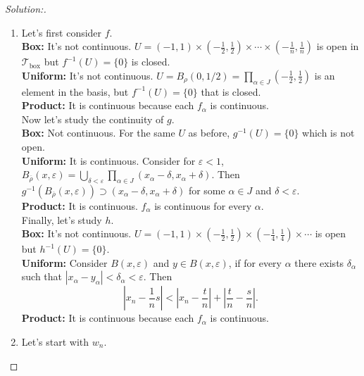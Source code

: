 \documentclass[a4paper,12pt, reqno]{article}
\theoremstyle{definition}
\newenvironment{solution}{\begin{proof}[Solution:]}{\end{proof}}
\newcommand{\T}{\mathscr{T}}
\begin{document}
\begin{solution}\hfill
  \begin{enumerate}[label=(\alph*)]
    \item Let's first consider $f$.\\

          \textbf{Box:} It's not continuous. $U = (-1,1)\times(-\frac{1}{2},\frac{1}{2})\times\cdots\times(-\frac{1}{n},\frac{1}{n})$ is open in $\T_{\text{box}}$ but $f^{-1}(U) = \{ 0 \}$ is closed.\\
          \textbf{Uniform:} It's not continuous. $U = B_{\rho}(0,1/2) = \prod_{\alpha\in J} (-\frac{1}{2},\frac{1}{2})$ is an element in the basis, but $f^{-1}(U) = \{ 0 \}$ that is closed.\\
          \textbf{Product:} It is continuous because each $f_{\alpha}$ is continuous.\\

          Now let's study the continuity of $g$.\\

          \textbf{Box:} Not continuous. For the same $U$ as before, $g^{-1}(U)=\{ 0 \}$ which is not open.\\
          \textbf{Uniform:} It is continuous. Consider for $\varepsilon<1$, $B_{\overline{\rho}}(x,\varepsilon) = \bigcup_{\delta<\varepsilon}\prod_{\alpha\in J}(x_{\alpha} -\delta,x_{\alpha}+\delta)$. Then $g^{-1}(B_{\overline{\rho}}(x,\varepsilon)) \supset(x_{\alpha}-\delta ,x_{\alpha}+\delta)$ for some $\alpha\in J$ and $\delta<\varepsilon$.\\
          \textbf{Product:} It is continuous. $f_{\alpha}$ is continuous for every $\alpha$.\\

          Finally, let's study $h$.\\

          \textbf{Box:} It's not continuous. $U = (-1,1)\times(-\frac{1}{2},\frac{1}{2})\times(-\frac{1}{4},\frac{1}{4})\times\cdots$ is open but $h^{-1}(U) = \{ 0 \}$.\\
          \textbf{Uniform:} Consider $B(x,\varepsilon)$ and $y\in B(x,\varepsilon)$, if for every $\alpha$ there exists $\delta_{\alpha}$ such that $|x_{\alpha}-y_{\alpha}|<\delta_{\alpha}<\varepsilon$.
          Then
          \begin{equation*}
            |x_{n}-\frac{1}{n}s|< |x_{n}-\frac{t}{n}| + |\frac{t}{n}-\frac{s}{n}|.
          \end{equation*}
          \textbf{Product:} It is continuous because each $f_{\alpha}$ is continuous.
    \item Let's start with $w_{n}$.\\


\end{enumerate}
\end{solution}
\end{document}
